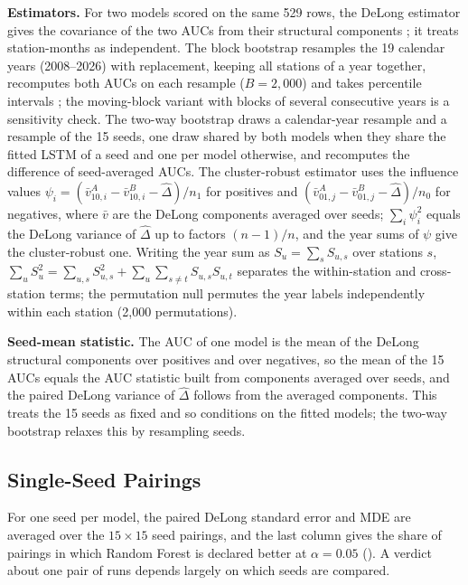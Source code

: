 \documentclass[11pt,a4paper]{article}
\begin{document}
\textbf{Estimators.} For two models scored on the same 529 rows, the DeLong estimator gives the covariance of the two AUCs from their structural components \citep{delong1988}; it treats station-months as independent. The block bootstrap resamples the 19 calendar years (2008--2026) with replacement, keeping all stations of a year together, recomputes both AUCs on each resample ($B=2{,}000$) and takes percentile intervals \citep{field2007}; the moving-block variant with blocks of several consecutive years \citep{kunsch1989} is a sensitivity check. The two-way bootstrap draws a calendar-year resample and a resample of the 15 seeds, one draw shared by both models when they share the fitted LSTM of a seed and one per model otherwise, and recomputes the difference of seed-averaged AUCs. The cluster-robust estimator uses the influence values $\psi_i=(\bar v^{A}_{10,i}-\bar v^{B}_{10,i}-\hat\Delta)/n_1$ for positives and $(\bar v^{A}_{01,j}-\bar v^{B}_{01,j}-\hat\Delta)/n_0$ for negatives, where $\bar v$ are the DeLong components averaged over seeds; $\sum_i\psi_i^2$ equals the DeLong variance of $\hat\Delta$ up to factors $(n-1)/n$, and the year sums of $\psi$ give the cluster-robust one. Writing the year sum as $S_u=\sum_s S_{u,s}$ over stations $s$, $\sum_u S_u^2=\sum_{u,s}S_{u,s}^2+\sum_u\sum_{s\ne t}S_{u,s}S_{u,t}$ separates the within-station and cross-station terms; the permutation null permutes the year labels independently within each station (2{,}000 permutations).

\textbf{Seed-mean statistic.} The AUC of one model is the mean of the DeLong structural components over positives and over negatives, so the mean of the 15 AUCs equals the AUC statistic built from components averaged over seeds, and the paired DeLong variance of $\hat\Delta$ follows from the averaged components. This treats the 15 seeds as fixed and so conditions on the fitted models; the two-way bootstrap relaxes this by resampling seeds.

\subsection{Single-Seed Pairings}
\label{app:single_seed}

For one seed per model, the paired DeLong standard error and MDE are averaged over the $15\times15$ seed pairings, and the last column gives the share of pairings in which Random Forest is declared better at $\alpha=0.05$ (). A verdict about one pair of runs depends largely on which seeds are compared.
\end{document}
